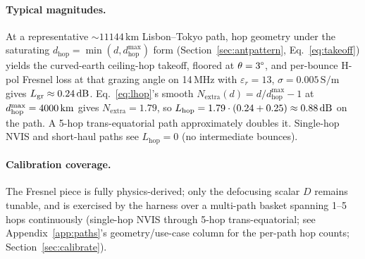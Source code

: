 \documentclass[11pt,a4paper]{article}
\newcommand{\SI}[2]{#1\,\text{#2}}
\newcommand{\dB}{\text{dB}}
\newcommand{\km}{\text{km}}
\begin{document}
\paragraph{Typical magnitudes.}  At a representative
$\sim\SI{11144}{km}$ Lisbon--Tokyo path, hop geometry under the
saturating $d_{\text{hop}} = \min(d, d_{\text{hop}}^{\max})$ form
(Section~\ref{sec:antpattern}, Eq.~\ref{eq:takeoff}) yields
the curved-earth ceiling-hop takeoff, floored at $\theta =
3\text{\textdegree}$,
and per-bounce H-pol Fresnel loss at that grazing angle on
14\,MHz with
$\varepsilon_r = 13$, $\sigma = \SI{0.005}{S/m}$ gives
$L_{\text{gr}} \approx \SI{0.24}{\dB}$. Eq.~\ref{eq:lhop}'s
smooth $N_{\text{extra}}(d) = d/d_{\text{hop}}^{\max} - 1$ at
$d_{\text{hop}}^{\max} = \SI{4000}{\km}$ gives
$N_{\text{extra}} = 1.79$, so
$L_{\text{hop}} = 1.79 \cdot (0.24 + 0.25) \approx \SI{0.88}{\dB}$
on the path.  A 5-hop trans-equatorial path approximately doubles
it.  Single-hop NVIS and short-haul paths see $L_{\text{hop}} = 0$
(no intermediate bounces).

\paragraph{Calibration coverage.}  The Fresnel piece is fully
physics-derived; only the defocusing scalar $D$ remains tunable,
and is exercised by the harness over a multi-path basket
spanning 1--5 hops continuously (single-hop NVIS through
5-hop trans-equatorial; see Appendix~\ref{app:paths}'s
geometry/use-case column for the per-path hop counts;
Section~\ref{sec:calibrate}).
\end{document}

